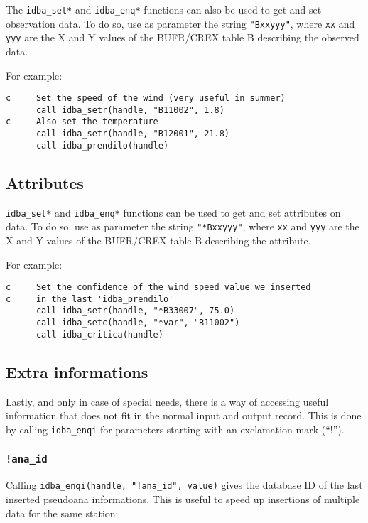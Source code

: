 \documentclass[draft,12pt,a4paper,twoside]{book}
\begin{document}
The {\tt idba\_set*} and {\tt idba\_enq*} functions can also be used to get and set
observation data.  To do so, use as parameter the string {\tt "Bxxyyy"}, where
{\tt xx} and {\tt yyy} are the X and Y values of the BUFR/CREX table B describing
the observed data.

For example:

\begin{verbatim}
c     Set the speed of the wind (very useful in summer)
      call idba_setr(handle, "B11002", 1.8)
c     Also set the temperature
      call idba_setr(handle, "B12001", 21.8)
      call idba_prendilo(handle)
\end{verbatim}


\subsection{Attributes}

{\tt idba\_set*} and {\tt idba\_enq*} functions can be used to get and set
attributes on data.  To do so, use as parameter the string {\tt "*Bxxyyy"},
where {\tt xx} and {\tt yyy} are the X and Y values of the BUFR/CREX table B
describing the attribute.

For example:

\begin{verbatim}
c     Set the confidence of the wind speed value we inserted
c     in the last 'idba_prendilo'
      call idba_setr(handle, "*B33007", 75.0)
      call idba_setc(handle, "*var", "B11002")
      call idba_critica(handle)
\end{verbatim}

\subsection{Extra informations}

Lastly, and only in case of special needs, there is a way of accessing useful
information that does not fit in the normal input and output record.  This is
done by calling {\tt idba\_enqi} for parameters starting with an exclamation
mark (``!'').

\subsubsection{{\tt !ana\_id}}

Calling {\tt idba\_enqi(handle, "!ana\_id", value)} gives the database ID of
the last inserted pseudoana informations.  This is useful to speed up
insertions of multiple data for the same station:
\end{document}
